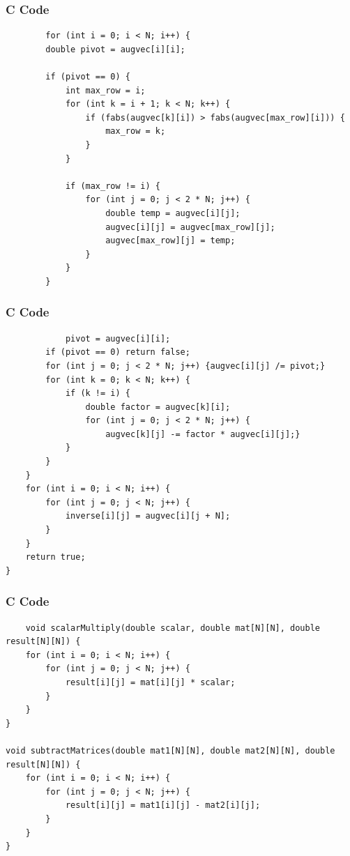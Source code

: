 \documentclass{beamer}
\begin{document}
\begin{frame}[fragile]
    \frametitle{C Code }
    \begin{lstlisting}
        for (int i = 0; i < N; i++) {
        double pivot = augvec[i][i];

        if (pivot == 0) {
            int max_row = i;
            for (int k = i + 1; k < N; k++) {
                if (fabs(augvec[k][i]) > fabs(augvec[max_row][i])) {
                    max_row = k;
                }
            }

            if (max_row != i) {
                for (int j = 0; j < 2 * N; j++) {
                    double temp = augvec[i][j];
                    augvec[i][j] = augvec[max_row][j];
                    augvec[max_row][j] = temp;
                }
            }
        }
\end{lstlisting}
\end{frame}
\begin{frame}[fragile]
    \frametitle{C Code }
    \begin{lstlisting}
            pivot = augvec[i][i];
        if (pivot == 0) return false;
        for (int j = 0; j < 2 * N; j++) {augvec[i][j] /= pivot;}
        for (int k = 0; k < N; k++) {
            if (k != i) {
                double factor = augvec[k][i];
                for (int j = 0; j < 2 * N; j++) {
                    augvec[k][j] -= factor * augvec[i][j];}
            }
        }
    }
    for (int i = 0; i < N; i++) {
        for (int j = 0; j < N; j++) {
            inverse[i][j] = augvec[i][j + N];
        }
    }
    return true;
}
\end{lstlisting}
\end{frame}
\begin{frame}[fragile]
    \frametitle{C Code }
    \begin{lstlisting}
    void scalarMultiply(double scalar, double mat[N][N], double result[N][N]) {
    for (int i = 0; i < N; i++) {
        for (int j = 0; j < N; j++) {
            result[i][j] = mat[i][j] * scalar;
        }
    }
}

void subtractMatrices(double mat1[N][N], double mat2[N][N], double result[N][N]) {
    for (int i = 0; i < N; i++) {
        for (int j = 0; j < N; j++) {
            result[i][j] = mat1[i][j] - mat2[i][j];
        }
    }
}
\end{lstlisting}
\end{frame}
\end{document}
